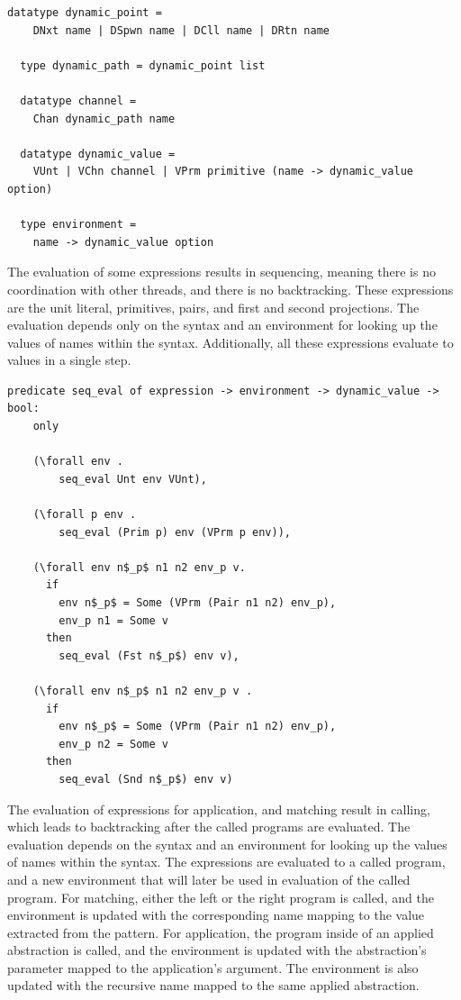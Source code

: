 \documentclass[10pt]{article}
\begin{document}
\begin{lstlisting}[language=logic]
  datatype dynamic_point =
    DNxt name | DSpwn name | DCll name | DRtn name 

  type dynamic_path = dynamic_point list

  datatype channel =
    Chan dynamic_path name 

  datatype dynamic_value = 
    VUnt | VChn channel | VPrm primitive (name -> dynamic_value option)

  type environment =
    name -> dynamic_value option
  \end{lstlisting}

The evaluation of some expressions results in sequencing, meaning there is no coordination
with other threads, and there is no backtracking. These expressions are the
unit literal, primitives, pairs, and first and second projections. The evaluation depends only
on the syntax and an environment for looking up the values of names within the syntax.
Additionally, all these expressions evaluate to values in a single step.

\begin{lstlisting}[language=logic, mathescape]
  predicate seq_eval of expression -> environment -> dynamic_value -> bool:
    only

    (\forall env . 
        seq_eval Unt env VUnt),
        
    (\forall p env .
        seq_eval (Prim p) env (VPrm p env)),

    (\forall env n$_p$ n1 n2 env_p v. 
      if
        env n$_p$ = Some (VPrm (Pair n1 n2) env_p),
        env_p n1 = Some v
      then
        seq_eval (Fst n$_p$) env v),

    (\forall env n$_p$ n1 n2 env_p v . 
      if
        env n$_p$ = Some (VPrm (Pair n1 n2) env_p), 
        env_p n2 = Some v 
      then
        seq_eval (Snd n$_p$) env v)
  \end{lstlisting}

The evaluation of expressions for application, and matching result in calling, which leads to
backtracking after the called programs are evaluated. The evaluation depends on the syntax
and an environment for looking up the values of names within the syntax.
The expressions are evaluated to a called program, and a new environment that will
later be used in evaluation of the called program. For matching, either the left or the right
program is called, and the environment is updated with the corresponding name mapping to the
value extracted from the pattern. For application, the program inside of an applied abstraction
is called, and the environment is updated with the abstraction's parameter mapped to the
application's argument. The environment is also updated with the recursive name mapped to the
same applied abstraction.
\end{document}
